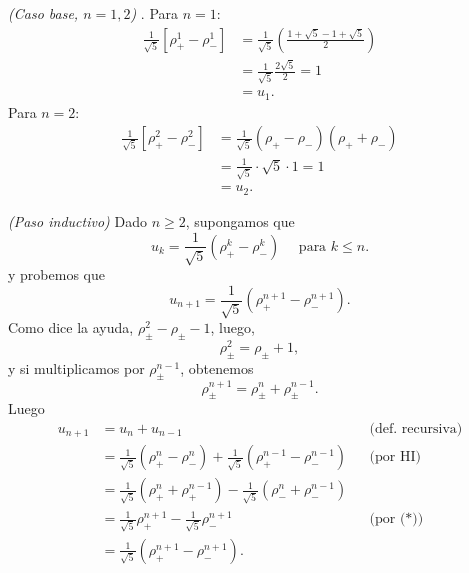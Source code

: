 \documentclass[a4paper,12pt,twoside,spanish,reqno]{amsbook}
\numberwithin{equation}{section}
\begin{document}
\begin{enumerate}[resume]
            \textit{(Caso  base, $n=1,2$) }. Para $n=1$:
            \begin{align*}
                \frac{1}{\sqrt{5}}\left[\rho_+^1-\rho_-^1\right]    &=  \frac{1}{\sqrt{5}}\left(\frac{1+\sqrt{5}- 1+\sqrt{5}}{2}\right) \\
                &=  \frac{1}{\sqrt{5}}\frac{2\sqrt{5}}{2} = 1 \\
                &= u_1. 
            \end{align*}
            Para $n=2$: 
            \begin{align*}
                \frac{1}{\sqrt{5}}\left[\rho_+^2-\rho_-^2\right]  &=  \frac{1}{\sqrt{5}}(\rho_+-\rho_-)(\rho_++\rho_-) \\
                &= \frac{1}{\sqrt{5}}\cdot \sqrt{5} \cdot 1 = 1\\
                &= u_2. 
            \end{align*}
            
            \textit{(Paso  inductivo)} Dado $n \ge 2$, supongamos que 
            \begin{equation}
                u_{k}= \frac{1}{\sqrt{5}}(\rho_+^{k} - \rho_-^{k})\quad \text{ para }k \le n. \tag{HI}
            \end{equation}
            y probemos que 
            \begin{equation*}
                u_{n+1}= \frac{1}{\sqrt{5}}(\rho_+^{n+1} - \rho_-^{n+1}).
            \end{equation*}
            Como dice la ayuda, $\rho_\pm^2 - \rho_\pm - 1$, luego, 
            $$
            \rho_\pm^2 = \rho_\pm + 1,
            $$ 
            y  si multiplicamos por  $ \rho_\pm^{n-1}$, obtenemos
            \begin{equation*}
                \rho_\pm^{n+1} = \rho_\pm^{n} + \rho_\pm^{n-1}. \tag{*}
            \end{equation*}
            Luego 
            \begin{align*}
                u_{n+1}&=  u_n + u_{n-1}&&\text{(def. recursiva)}\\
                &= \frac{1}{\sqrt{5}}(\rho_+^{n} - \rho_-^{n}) + \frac{1}{\sqrt{5}}(\rho_+^{n-1} - \rho_-^{n-1})&&\text{(por HI)}\\
                &= \frac{1}{\sqrt{5}}(\rho_+^{n} + \rho_+^{n-1}) - \frac{1}{\sqrt{5}}(\rho_-^{n} +\rho_-^{n-1})&&\\
                &= \frac{1}{\sqrt{5}}\rho_+^{n+1} - \frac{1}{\sqrt{5}}\rho_-^{n+1}&&\text{(por (*))}\\
                &=\frac{1}{\sqrt{5}}(\rho_+^{n+1} - \rho_-^{n+1}).&&
            \end{align*}
    

\end{enumerate}
\end{document}

